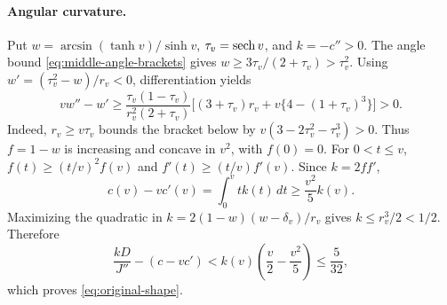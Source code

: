 \paragraph{Angular curvature.}
Put \(w=\arcsin(\tanh v)/\sinh v\), \(\tau_v=\operatorname{sech} v\),
and \(k=-c''>0\). The angle bound
\eqref{eq:middle-angle-brackets} gives
\(w\ge3\tau_v/(2+\tau_v)>\tau_v^2\).
Using \(w'=(\tau_v^2-w)/r_v<0\), differentiation yields
\[
 vw''-w'\ge
 \frac{\tau_v(1-\tau_v)}{r_v^2(2+\tau_v)}
 \bigl[(3+\tau_v)r_v+v\{4-(1+\tau_v)^3\}\bigr]>0.
\]
Indeed, \(r_v\ge v\tau_v\) bounds the bracket below by
\(v(3-2\tau_v^2-\tau_v^3)>0\).
Thus \(f=1-w\) is increasing and concave in \(v^2\), with
\(f(0)=0\). For \(0<t\le v\),
\(f(t)\ge(t/v)^2f(v)\) and \(f'(t)\ge(t/v)f'(v)\).
Since \(k=2ff'\),
\begin{equation}
 c(v)-vc'(v)=\int_0^v tk(t)\,dt\ge\frac{v^2}{5}k(v).
 \label{eq:angle-curvature-scaling}
\end{equation}
Maximizing the quadratic in
\(k=2(1-w)(w-\delta_v)/r_v\) gives
\(k\le r_v^3/2<1/2\). Therefore
\[
 \frac{kD}{J''}-(c-vc')
 <k(v)\left(\frac v2-\frac{v^2}5\right)\le\frac5{32},
\]
which proves \eqref{eq:original-shape}.
